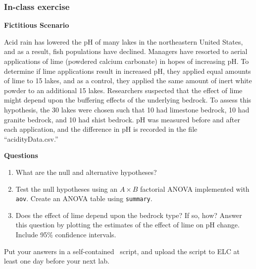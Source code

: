 \documentclass[color=usenames,dvipsnames]{beamer}\usepackage[]{graphicx}\usepackage[]{color}
\newcommand{\inr}[1]{\colorbox{inlinecolor}{\texttt{#1}}}
\begin{document}
\begin{frame}
  \frametitle{In-class exercise}
\scriptsize %

{\bf Fictitious Scenario \par}
Acid rain has lowered the pH of many
lakes in the northeastern United States, and as a result, fish
populations have declined. Managers have resorted to aerial
applications of lime (powdered calcium carbonate) in hopes of
increasing pH. To determine if lime applications result in increased
pH, they applied equal amounts of lime to 15 lakes, and as a control,
they applied the same amount of inert white powder to an additional 15
lakes. Researchers suspected that the effect of lime might depend upon
the buffering effects of the underlying bedrock. To assess this
hypothesis, the 30 lakes were chosen such that 10 had limestone
bedrock, 10 had granite bedrock, and 10 had shist bedrock. pH was
measured before and after each application, and the difference in pH
is recorded in the file ``acidityData.csv.'' \par
\pause
\vfill
{\bf Questions}
\begin{enumerate}[{\bf 1}]
  \item What are the null and alternative hypotheses?
  \item Test the null hypotheses using an $A \times B$ factorial ANOVA
    implemented with \inr{aov}. Create an ANOVA table using \inr{summary}.
  \item Does the effect of lime depend upon the bedrock type? If so,
    how? Answer this question by plotting the estimates of the effect of lime on
    pH change. Include 95\% confidence intervals.
\end{enumerate}
\pause
\vfill
Put your answers in a self-contained \R~script, and upload the script
to ELC at least one day before your next lab.
\end{frame}
\end{document}
